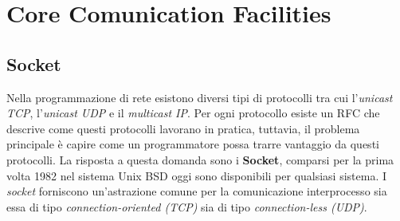 \section{Core Comunication Facilities}
\subsection{Socket}
Nella programmazione di rete esistono diversi tipi di protocolli tra cui l'\emph{unicast TCP}, l'\emph{unicast UDP} e il \emph{multicast IP}. Per ogni protocollo esiste un RFC che descrive come questi protocolli lavorano in pratica, tuttavia, il problema principale è capire come un programmatore possa trarre vantaggio da questi protocolli. La risposta a questa domanda sono i \textbf{Socket}, comparsi per la prima volta 1982 nel sistema Unix BSD oggi sono disponibili per qualsiasi sistema. I \emph{socket} forniscono un'astrazione comune per la comunicazione interprocesso sia essa di tipo \emph{connection-oriented (TCP)} sia di tipo \emph{connection-less (UDP)}.\\
